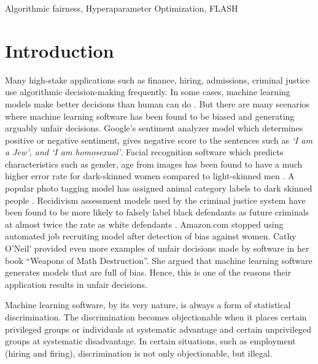 \documentclass[10pt,conference]{IEEEtran}
\begin{document}
\begin{IEEEkeywords}
Algorithmic fairness, Hyperaparameter Optimization, FLASH
\end{IEEEkeywords}

\section{Introduction}
Many high-stake applications such as finance, hiring, admissions, criminal justice use algorithmic decision-making frequently. In some cases, machine learning models make better decisions than human can do \cite{Brun:2018:SF:3236024.3264838,Aydemir:2018:RES:3194770.3194778}. But there are many scenarios where machine learning software has been found to be biased and generating arguably unfair decisions. Google's sentiment analyzer model which determines positive or negative sentiment, gives negative score to the sentences such as \textit{`I am a Jew', and `I am homosexual'}\cite{Google_Sentiment}. Facial recognition software which predicts characteristics such as gender, age from images has been found to have a much higher error rate for dark-skinned women compared to light-skinned men \cite{Gender_Bias}. A popular photo tagging model has assigned animal category labels to dark skinned people \cite{Google_Photo}. Recidivism assessment models used by the criminal justice system have been found to be more likely to falsely label black defendants as future criminals at almost twice the rate as white defendants \cite{Machine_Bias}. Amazon.com stopped using automated job recruiting model after detection of bias against women\cite{Amazon_Bias}. Cathy O'Neil’ provided even more examples of unfair decisions made by software in her book ``Weapons of Math Destruction''\cite{O'Neil:2016:WMD:3002861}. She argued that machine learning software generates models that are full of bias. Hence, this is one of the reasons their application results in unfair decisions.


Machine learning software, by its very nature, is always a form of statistical discrimination. The discrimination becomes objectionable when it places certain privileged groups or individuals at systematic advantage and certain unprivileged groups at systematic disadvantage. In certain situations, such as employment (hiring and firing), discrimination is not only objectionable, but illegal.
\end{document}

